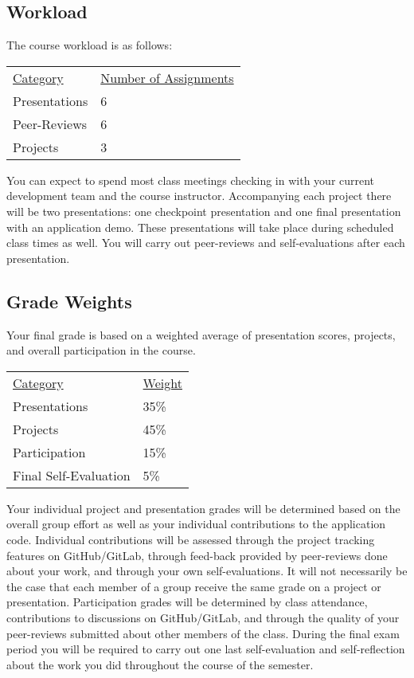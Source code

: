 \documentclass[10pt]{article}
\begin{document}
\subsection{Workload}

The course workload is as follows:
\begin{center}
  \begin{tabular}{ll}
    \underline{Category} & \underline{Number of Assignments} \\
    Presentations & 6 \\
    Peer-Reviews & 6 \\
    Projects & 3 \\
  \end{tabular}
\end{center}

You can expect to spend most class meetings checking in with your current development team and the course instructor. Accompanying each project there will be two presentations: one checkpoint presentation and one final presentation with an application demo. These presentations will take place during scheduled class times as well. You will carry out peer-reviews and self-evaluations after each presentation.

\subsection{Grade Weights}

Your final grade is based on a weighted average of presentation scores, projects, and overall participation in the course.

\begin{center}
  \begin{tabular}{ll}
  \underline{Category} & \underline{Weight} \\
    Presentations & 35\% \\
    Projects & 45\% \\
    Participation & 15\% \\
    Final Self-Evaluation & 5\%
  \end{tabular}
\end{center}

Your individual project and presentation grades will be determined based on the overall group effort as well as your individual contributions to the application code. Individual contributions will be assessed through the project tracking features on GitHub/GitLab, through feed-back provided by peer-reviews done about your work, and through your own self-evaluations. It will not necessarily be the case that each member of a group receive the same grade on a project or presentation.  Participation grades will be determined by class attendance, contributions to discussions on GitHub/GitLab, and through the quality of your peer-reviews submitted about other members of the class. During the final exam period you will be required to carry out one last self-evaluation and self-reflection about the work you did throughout the course of the semester.
\end{document}
